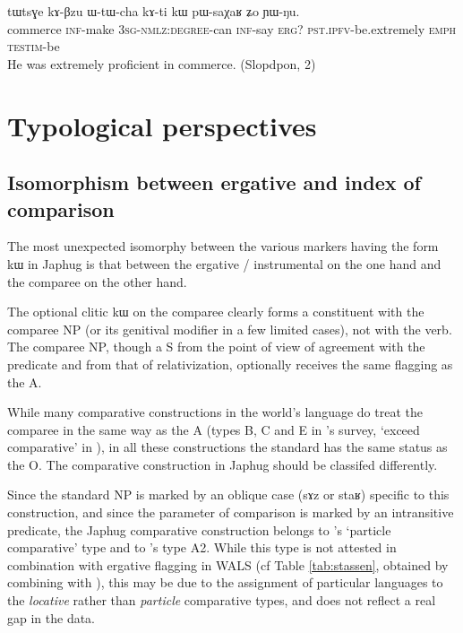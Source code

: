 \documentclass[oldfontcommands,oneside,a4paper,11pt]{article}
\newcommand{\ipa}[1]{{\phon #1}} %
\begin{document}
    \begin{exe}
  \ex  \label{ex:kAti.kW}  
  \gll
\ipa{tɯtsɣe}  	\ipa{kɤ-βzu}  	\ipa{ɯ-tɯ-cha}  	\ipa{kɤ-ti}  	\ipa{kɯ}  	\ipa{pɯ-saχaʁ}  	\ipa{ʑo}  	\ipa{ɲɯ-ŋu.}  \\
commerce \textsc{inf}-make \textsc{3sg-nmlz:degree}-can \textsc{inf}-say \textsc{erg?} \textsc{pst.ipfv}-be.extremely \textsc{emph} \textsc{testim}-be \\
\glt He was extremely proficient in commerce. (Slopdpon, 2)
   \end{exe} 
% 

 
%
%
%
 
 
 
 
\section{Typological perspectives}

\subsection{Isomorphism between ergative and index of comparison}
The most unexpected isomorphy between the various markers having the form \ipa{kɯ} in Japhug is that between the ergative / instrumental on the one hand and the comparee on the other hand.   

The optional clitic \ipa{kɯ} on the comparee  clearly forms a constituent with the comparee NP (or its genitival modifier in a few limited cases), not with the verb. The comparee NP, though a S from the point of view of agreement with the predicate and from that of relativization, optionally receives  the same flagging as the A.

 
While many comparative constructions in the world's language do treat the comparee in the same way as the A (types B, C and E in \citealt[789]{dixon08comparative}'s survey, `exceed comparative' in  \citealt{stassen11comparative}), in all these constructions the standard has the same status as the O.  The comparative construction in Japhug should be classifed differently. 

Since the standard NP is marked by an oblique case (\ipa{sɤz} or \ipa{staʁ}) specific to this construction, and since the parameter of comparison is marked by an intransitive predicate, the Japhug comparative construction belongs to  \citet{stassen11comparative}'s `particle comparative' type and to \citealt[789]{dixon08comparative}'s type A2.  While this type is not attested in combination with  ergative flagging in WALS (cf Table \ref{tab:stassen}, obtained by combining \citealt{stassen11comparative} with \citealt{comrie11case}), this may be due to the assignment of particular languages to the \textit{locative} rather than \textit{particle}  comparative types, and does not reflect a real gap in the data.
\end{document}
